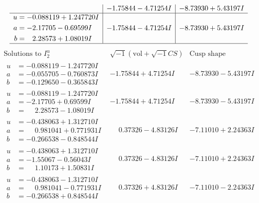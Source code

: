\documentclass[1p]{elsarticle_modified}
\theoremstyle{definition}
\newcommand{\I}{\sqrt{-1}}
\begin{document}
$$\begin{array}{c|c|c}
 & -1.75844 - 4.71254 I & -8.73930 + 5.43197 I \\ \hline\begin{aligned}
u &= -0.088119 + 1.247720 I \\
a &= -2.17705 - 0.69599 I \\
b &= \phantom{-}2.28573 + 1.08019 I\end{aligned}
 & -1.75844 - 4.71254 I & -8.73930 + 5.43197 I\\
 \hline 
 \end{array}$$\newpage$$\begin{array}{c|c|c}  
\text{Solutions to }I^u_{2}& \I (\text{vol} + \sqrt{-1}CS) & \text{Cusp shape}\\
 \hline 
\begin{aligned}
u &= -0.088119 - 1.247720 I \\
a &= -0.055705 - 0.760873 I \\
b &= -0.129650 - 0.365843 I\end{aligned}
 & -1.75844 + 4.71254 I & -8.73930 - 5.43197 I \\ \hline\begin{aligned}
u &= -0.088119 - 1.247720 I \\
a &= -2.17705 + 0.69599 I \\
b &= \phantom{-}2.28573 - 1.08019 I\end{aligned}
 & -1.75844 + 4.71254 I & -8.73930 - 5.43197 I \\ \hline\begin{aligned}
u &= -0.438063 + 1.312710 I \\
a &= \phantom{-}0.981041 + 0.771931 I \\
b &= -0.266538 - 0.848544 I\end{aligned}
 & \phantom{-}0.37326 - 4.83126 I & -7.11010 + 2.24363 I \\ \hline\begin{aligned}
u &= -0.438063 + 1.312710 I \\
a &= -1.55067 - 0.56043 I \\
b &= \phantom{-}1.10173 + 1.50831 I\end{aligned}
 & \phantom{-}0.37326 - 4.83126 I & -7.11010 + 2.24363 I \\ \hline\begin{aligned}
u &= -0.438063 - 1.312710 I \\
a &= \phantom{-}0.981041 - 0.771931 I \\
b &= -0.266538 + 0.848544 I\end{aligned}
 & \phantom{-}0.37326 + 4.83126 I & -7.11010 - 2.24363 I \\ \hline\begin{aligned}

\end{aligned}
\end{array}$$
\end{document}
